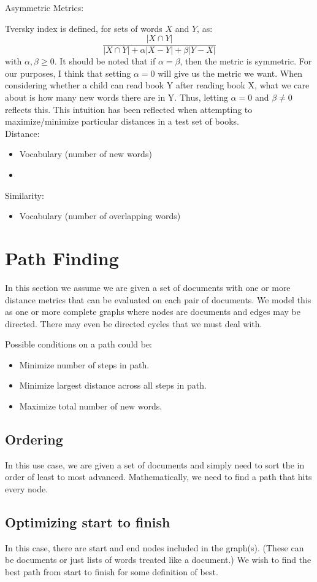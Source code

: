 \documentclass[11pt]{paper}
\begin{document}
Asymmetric Metrics:

Tversky index is defined, for sets of words $X$ and $Y$, as:
$$\frac{|X \cap Y|}{|X \cap Y| + \alpha |X - Y| + \beta |Y - X|}$$
with $\alpha, \beta \geq 0$. It should be noted that if $\alpha = \beta$, then the metric is symmetric. For our purposes, I think that setting $\alpha = 0$ will give us the metric we want. When considering whether a child can read book Y after reading book X, what we care about is how many new words there are in Y. Thus, letting $\alpha = 0$ and $\beta \neq 0$ reflects this. This intuition has been reflected when attempting to maximize/minimize particular distances in a test set of books.\\

Distance:
\begin{itemize}
  \item Vocabulary (number of new words)
  \item
\end{itemize}

Similarity:
\begin{itemize}
  \item Vocabulary (number of overlapping words)
\end{itemize}


\section{Path Finding}

In this section we assume we are given a set of documents with one or more distance metrics that can be evaluated on each pair of documents. We model this as one or more complete graphs where nodes are documents and edges may be directed. There may even be directed cycles that we must deal with.

Possible conditions on a path could be:
\begin{itemize}
  \item Minimize number of steps in path.
  \item Minimize largest distance across all steps in path.
  \item Maximize total number of new words.
\end{itemize}

\subsection{Ordering}

In this use case, we are given a set of documents and simply need to sort the in order of least to most advanced. Mathematically, we need to find a path that hits every node.

\subsection{Optimizing start to finish}

In this case, there are start and end nodes included in the graph(s). (These can be documents or just lists of words treated like a document.) We wish to find the best path from start to finish for some definition of best.
\end{document}
